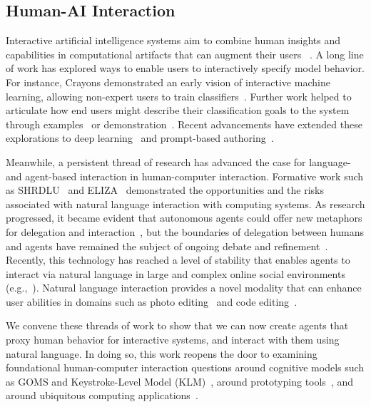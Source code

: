 \subsection{Human-AI Interaction} Interactive artificial intelligence systems aim to combine human insights and capabilities in computational artifacts that can augment their users ~\cite{amershi2014power, fails2003interactive}. A long line of work has explored ways to enable users to interactively specify model behavior. For instance, Crayons demonstrated an early vision of interactive machine learning, allowing non-expert users to train classifiers~\cite{fails2003interactive}. Further work helped to articulate how end users might describe their classification goals to the system through examples~\cite{Fogarty2008} or demonstration~\cite{fiebrink2010wekinator}. Recent advancements have extended these explorations to deep learning~\cite{lam2023model} and prompt-based authoring~\cite{jiang_PromptMaker,62_Wu2021AIChains,liu2022opal}.

Meanwhile, a persistent thread of research has advanced the case for language- and agent-based interaction in human-computer interaction. Formative work such as SHRDLU~\cite{winograd1971procedures} and ELIZA~\cite{weizenbaum1966eliza} demonstrated the opportunities and the risks associated with natural language interaction with computing systems. As research progressed, it became evident that autonomous agents could offer new metaphors for delegation and interaction~\cite{MaesPattie1995}, but the boundaries of delegation between humans and agents have remained the subject of ongoing debate and refinement~\cite{shneiderman1997direct,horvitz1999principles,shneiderman2022human}. Recently, this technology has reached a level of stability that enables agents to interact via natural language in large and complex online social environments (e.g.,~\cite{Krishna2022}). Natural language interaction provides a novel modality that can enhance user abilities in domains such as photo editing~\cite{laput2013pixeltone, fourney2011query, adar2014command} and code editing~\cite{rong2016codemend}.

We convene these threads of work to show that we can now create agents that proxy human behavior for interactive systems, and interact with them using natural language. In doing so, this work reopens the door to examining foundational human-computer interaction questions around cognitive models such as GOMS and Keystroke-Level Model (KLM)~\cite{card1983psychology,card1980keystroke}, around prototyping tools~\cite{9_park2022socialsimulacra}, and around ubiquitous computing applications~\cite{weiser1991computer,dey2001understanding,fast2016augur}.

